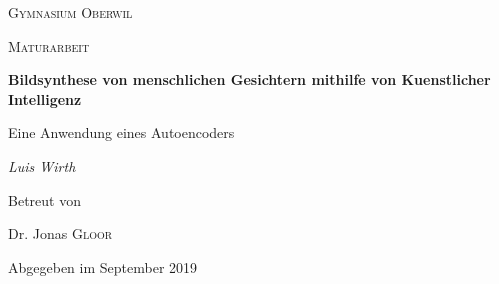 \documentclass[../main]{subfiles}
\begin{document}
\begin{titlepage}
    \centering
    
    {\scshape\LARGE Gymnasium Oberwil\par}
    \vspace{1cm}
    {\scshape\Large Maturarbeit\par}
    \vspace{1.5cm}
    {\huge\bfseries Bildsynthese von menschlichen Gesichtern mithilfe von Kuenstlicher Intelligenz\par}
    \vspace{0.2cm}
    {Eine Anwendung eines Autoencoders\par}
    \vspace{2cm}
    {\Large\itshape Luis Wirth\par}
    \vfill
    Betreut von\par
    Dr. Jonas \textsc{Gloor}
    
    \vfill
    {\large Abgegeben im September 2019\par}
\end{titlepage}
\end{document}
